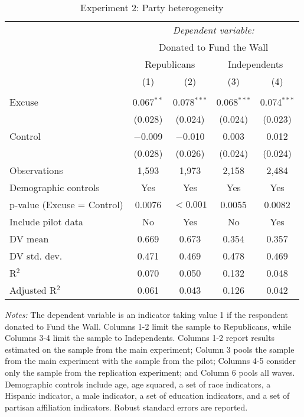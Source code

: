 
\begin{table}[!htbp] \centering 
  \caption{Experiment 2: Party heterogeneity} 
  \label{t:2-partyheterogeneity} 
\begin{threeparttable}
\begin{tabular}{@{\hspace{5pt}}l@{\hspace{5pt}}cccc} 
\toprule 
 & \multicolumn{4}{c}{\textit{Dependent variable:}} \\ 
\cmidrule(rr){2-5} 
 & \multicolumn{4}{c}{Donated to Fund the Wall} \\ 
 \cmidrule(rr){2-5}
 & \multicolumn{2}{c}{Republicans} & \multicolumn{2}{c}{Independents} \\ 
 & (1) & (2) & (3) & (4)\\ 
\midrule  
\\[-2.1ex] Excuse & 0.067$^{**}$ & 0.078$^{***}$ & 0.068$^{***}$ & 0.074$^{***}$ \\ 
  & (0.028) & (0.024) & (0.024) & (0.023) \\ 
 \addlinespace 
 Control & $-$0.009 & $-$0.010 & 0.003 & 0.012 \\ 
  & (0.028) & (0.026) & (0.024) & (0.024) \\ 
 \addlinespace 
Observations & 1,593 & 1,973 & 2,158 & 2,484 \\ 
\midrule  
Demographic controls & Yes & Yes & Yes & Yes \\ 
p-value (Excuse = Control) & 0.0076 & $<0.001$ & 0.0055 & 0.0082 \\ 
\midrule
Include pilot data & No & Yes & No & Yes \\
\addlinespace
DV mean & 0.669 & 0.673 & 0.354 & 0.357 \\
DV std. dev. & 0.471 & 0.469 & 0.478 & 0.469 \\
R$^{2}$ & 0.070 & 0.050 & 0.132 & 0.048 \\ 
Adjusted R$^{2}$ & 0.061 & 0.043 & 0.126 & 0.042 \\ 
\bottomrule 
\end{tabular} 
\begin{tablenotes}
\footnotesize
\item \textit{Notes:} The dependent variable is an indicator taking value 1 if the respondent donated to Fund the Wall. Columns 1-2 limit the sample to Republicans, while Columns 3-4 limit the sample to Independents. Columns 1-2 report results estimated on the sample from the main experiment; Column 3 pools the sample from the main experiment with the sample from the pilot; Columns 4-5 consider only the sample from the replication experiment; and Column 6 pools all waves. Demographic controls include age, age squared, a set of race indicators, a Hispanic indicator, a male indicator, a set of education indicators, and a set of partisan affiliation indicators. Robust standard errors are reported.
\end{tablenotes}
\end{threeparttable}
\end{table} 
